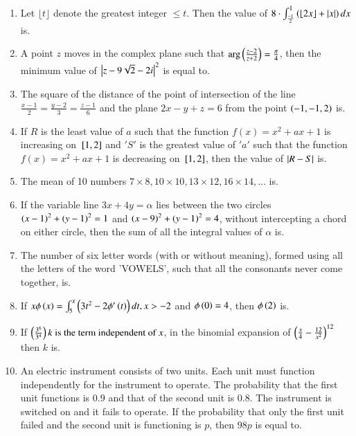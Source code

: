 \documentclass[journal]{IEEEtran}
\begin{document}
\begin{enumerate}[start=1]
\item Let $\lfloor t\rfloor$ denote the greatest integer $\leq t$. Then the value of $8 \cdot \int_{\frac{-1}{2}}^{1} \left(\lfloor 2x\rfloor + \left\vert x\right\vert\right) dx $
is.
\item A point $z$ moves in the complex plane such that 
$\arg\left(\frac{z - 2}{z + 2}\right) = \frac{\pi}{4}$, then the minimum value of $\left\vert z - 9\sqrt{2} - 2i\right\vert^2$ is equal to.
\item  The square of the distance of the point of intersection of the line 
$\frac{x - 1}{2} = \frac{y - 2}{3} = \frac{z - 1}{6}$
and the plane $2x - y + z = 6$ from the point $\left(-1, -1, 2\right)$ is.
\item If $R$ is the least value of $a$ such that the function $f(x) = x^2 + ax + 1$ is increasing on ${}\left[1, 2\right]$ and $'S'$ is the greatest value of $'a'$ such that the function $f(x) = x^2 + ax + 1$ is decreasing on ${}\left[1, 2\right]$, then the value of $\left\vert R - S\right\vert$ is.
\item The mean of 10 numbers $7 \times 8, 10 \times 10, 13 \times 12, 16 \times 14, \dots$ is.
\item  If the variable line $3x + 4y = \alpha$ lies between the two circles $\left(x - 1\right)^2 + \left(y - 1\right)^2 = 1$ and $\left(x - 9\right)^2 + \left(y - 1\right)^2 = 4$, without intercepting a chord on either circle, then the sum of all the integral values of $\alpha$ is.
\item The number of six letter words (with or without meaning), formed using all the letters of the word 'VOWELS', such that all the consonants never come together, is.
\item If $x\phi\left(x\right) =\int_{5}^{x}\left(3t^2 - 2\phi^\prime\left(t\right)\right) dt, x > -2$
and $\phi\left(0\right) = 4$, then $\phi\left(2\right)$ is.
\item If $\left(\frac{3^6}{3^4}\right)k \text{ is the term independent of } x$, in the binomial expansion of $\left(\frac{x}{4} - \frac{12}{x^2}\right)^{12}
$ then $k$ is.
\item An electric instrument consists of two units. Each unit must function independently for the instrument to operate. The probability that the first unit functions is $0.9$ and that of the second unit is $0.8$. The instrument is switched on and it fails to operate. If the probability that only the first unit failed and the second unit is functioning is $p$, then $98p$ is equal to.
\end{enumerate}
\end{document}
